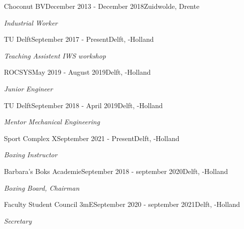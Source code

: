 \begin{rSection}{}
\begin{experienceItem}{Choconut BV}{December 2013 - December 2018}{}{Zuidwolde, Drente}
\item \textit{Industrial Worker}
\end{experienceItem}

\begin{experienceItem}{TU Delft}{September 2017 - Present}{}{Delft, -Holland}
\item \textit{Teaching Assistent IWS workshop}
\end{experienceItem}

\begin{experienceItem}{ROCSYS}{May 2019 - August 2019}{}{Delft, -Holland}
\item \textit{Junior Engineer}
\end{experienceItem}

\begin{experienceItem}{TU Delft}{September 2018 - April 2019}{}{Delft, -Holland}
\item \textit{Mentor Mechanical Engineering}
\end{experienceItem}


\begin{experienceItem}{Sport Complex X}{September 2021 - Present}{}{Delft, -Holland}
\item \textit{Boxing Instructor}
\end{experienceItem}
\end{rSection}


\begin{rSection}{}

\begin{experienceItem}{Barbara's Boks Academie}{September 2018 - september 2020}{}{Delft, -Holland}
\item \textit{Boxing Board, Chairman}
\end{experienceItem}

\begin{experienceItem}{Faculty Student Council 3mE}{September 2020 - september 2021}{}{Delft, -Holland}
\item \textit{Secretary}
\end{experienceItem}
\end{rSection}

